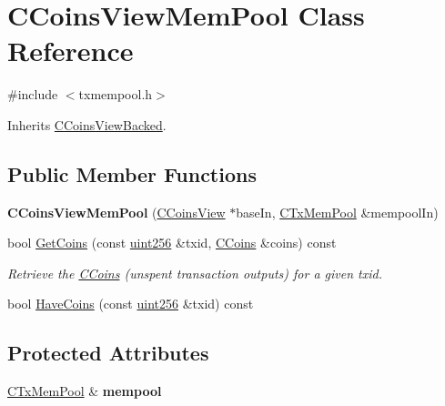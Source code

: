 \hypertarget{class_c_coins_view_mem_pool}{}\section{C\+Coins\+View\+Mem\+Pool Class Reference}
\label{class_c_coins_view_mem_pool}


{\ttfamily \#include $<$txmempool.\+h$>$}



Inherits \mbox{\hyperlink{class_c_coins_view_backed}{C\+Coins\+View\+Backed}}.

\subsection*{Public Member Functions}
\begin{DoxyCompactItemize}
\item 
\mbox{\label{class_c_coins_view_mem_pool_aab9a206c304acec322fddf646c7bafb9}} 
{\bfseries C\+Coins\+View\+Mem\+Pool} (\mbox{\hyperlink{class_c_coins_view}{C\+Coins\+View}} $\ast$base\+In, \mbox{\hyperlink{class_c_tx_mem_pool}{C\+Tx\+Mem\+Pool}} \&mempool\+In)
\item 
\mbox{\label{class_c_coins_view_mem_pool_a1a4a556821b1680ff4b73758c8a1e471}} 
bool \mbox{\hyperlink{class_c_coins_view_mem_pool_a1a4a556821b1680ff4b73758c8a1e471}{Get\+Coins}} (const \mbox{\hyperlink{classuint256}{uint256}} \&txid, \mbox{\hyperlink{class_c_coins}{C\+Coins}} \&coins) const
\begin{DoxyCompactList}\small\item\em Retrieve the \mbox{\hyperlink{class_c_coins}{C\+Coins}} (unspent transaction outputs) for a given txid. \end{DoxyCompactList}\item 
bool \mbox{\hyperlink{class_c_coins_view_mem_pool_a2c5900448dc5570053060686ad1f014b}{Have\+Coins}} (const \mbox{\hyperlink{classuint256}{uint256}} \&txid) const
\end{DoxyCompactItemize}
\subsection*{Protected Attributes}
\begin{DoxyCompactItemize}
\item 
\mbox{\label{class_c_coins_view_mem_pool_a7a3870fc65376cb311a0b3abb28fec10}} 
\mbox{\hyperlink{class_c_tx_mem_pool}{C\+Tx\+Mem\+Pool}} \& {\bfseries mempool}
\end{DoxyCompactItemize}


